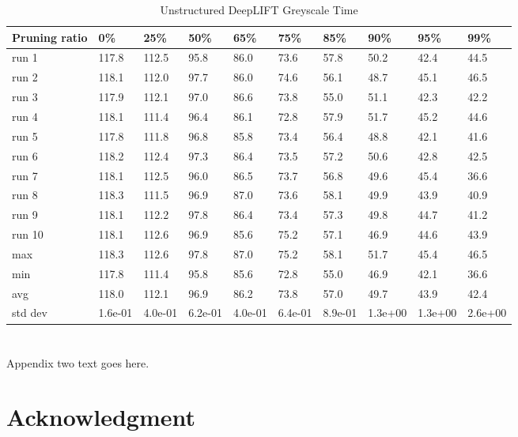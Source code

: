 \documentclass[journal,onecolumn,12pt]{IEEEtran}
\begin{document}
\begin{table}[htbp]
    \caption{Unstructured DeepLIFT Greyscale Time}
    \begin{center}
    \begin{tabular}{ |p{2cm}|p{1cm}|p{1cm}|p{1cm}|p{1cm}|p{1cm}|p{1cm}|p{1cm}|p{1cm}|p{1cm}|  }
     \hline
     Pruning ratio  & 0\% & 25\%& 50\%& 65\%& 75\%& 85\%& 90\%& 95\%& 99\%\\
     \hline
     run 1&117.8&112.5&95.8&86.0&73.6&57.8&50.2&42.4&44.5\\
     run 2&118.1&112.0&97.7&86.0&74.6&56.1&48.7&45.1&46.5\\
     run 3&117.9&112.1&97.0&86.6&73.8&55.0&51.1&42.3&42.2\\
     run 4&118.1&111.4&96.4&86.1&72.8&57.9&51.7&45.2&44.6\\
     run 5&117.8&111.8&96.8&85.8&73.4&56.4&48.8&42.1&41.6\\
     run 6&118.2&112.4&97.3&86.4&73.5&57.2&50.6&42.8&42.5\\
     run 7&118.1&112.5&96.0&86.5&73.7&56.8&49.6&45.4&36.6\\
     run 8&118.3&111.5&96.9&87.0&73.6&58.1&49.9&43.9&40.9\\
     run 9&118.1&112.2&97.8&86.4&73.4&57.3&49.8&44.7&41.2\\
     run 10&118.1&112.6&96.9&85.6&75.2&57.1&46.9&44.6&43.9\\
     \hline
        max     &118.3&112.6&97.8&87.0&75.2&58.1&51.7&45.4&46.5\\
        min     &117.8&111.4&95.8&85.6&72.8&55.0&46.9&42.1&36.6\\
        avg     &118.0&112.1&96.9&86.2&73.8&57.0&49.7&43.9&42.4\\
        std dev &1.6e-01&4.0e-01&6.2e-01&4.0e-01&6.4e-01&8.9e-01&1.3e+00&1.3e+00&2.6e+00\\
     \hline
    \end{tabular}
    \end{center}
    \label{tab:a10}
\end{table}

\section{}
Appendix two text goes here.


\section*{Acknowledgment}
\end{document}
